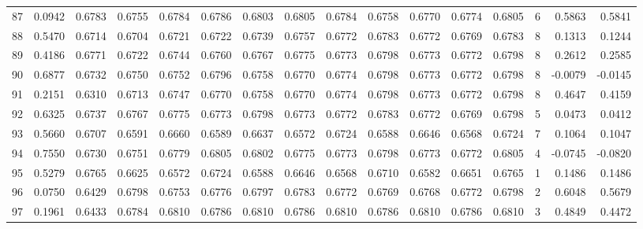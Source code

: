 \begin{tabular}{lrrrrrrrrrrrrrrr}
87  &      0.0942 &  0.6783 &  0.6755 &  0.6784 &  0.6786 &  0.6803 &  0.6805 &  0.6784 &  0.6758 &  0.6770 &   0.6774 &     0.6805 &      6 &                    0.5863 &                     0.5841 \\
88  &      0.5470 &  0.6714 &  0.6704 &  0.6721 &  0.6722 &  0.6739 &  0.6757 &  0.6772 &  0.6783 &  0.6772 &   0.6769 &     0.6783 &      8 &                    0.1313 &                     0.1244 \\
89  &      0.4186 &  0.6771 &  0.6722 &  0.6744 &  0.6760 &  0.6767 &  0.6775 &  0.6773 &  0.6798 &  0.6773 &   0.6772 &     0.6798 &      8 &                    0.2612 &                     0.2585 \\
90  &      0.6877 &  0.6732 &  0.6750 &  0.6752 &  0.6796 &  0.6758 &  0.6770 &  0.6774 &  0.6798 &  0.6773 &   0.6772 &     0.6798 &      8 &                   -0.0079 &                    -0.0145 \\
91  &      0.2151 &  0.6310 &  0.6713 &  0.6747 &  0.6770 &  0.6758 &  0.6770 &  0.6774 &  0.6798 &  0.6773 &   0.6772 &     0.6798 &      8 &                    0.4647 &                     0.4159 \\
92  &      0.6325 &  0.6737 &  0.6767 &  0.6775 &  0.6773 &  0.6798 &  0.6773 &  0.6772 &  0.6783 &  0.6772 &   0.6769 &     0.6798 &      5 &                    0.0473 &                     0.0412 \\
93  &      0.5660 &  0.6707 &  0.6591 &  0.6660 &  0.6589 &  0.6637 &  0.6572 &  0.6724 &  0.6588 &  0.6646 &   0.6568 &     0.6724 &      7 &                    0.1064 &                     0.1047 \\
94  &      0.7550 &  0.6730 &  0.6751 &  0.6779 &  0.6805 &  0.6802 &  0.6775 &  0.6773 &  0.6798 &  0.6773 &   0.6772 &     0.6805 &      4 &                   -0.0745 &                    -0.0820 \\
95  &      0.5279 &  0.6765 &  0.6625 &  0.6572 &  0.6724 &  0.6588 &  0.6646 &  0.6568 &  0.6710 &  0.6582 &   0.6651 &     0.6765 &      1 &                    0.1486 &                     0.1486 \\
96  &      0.0750 &  0.6429 &  0.6798 &  0.6753 &  0.6776 &  0.6797 &  0.6783 &  0.6772 &  0.6769 &  0.6768 &   0.6772 &     0.6798 &      2 &                    0.6048 &                     0.5679 \\
97  &      0.1961 &  0.6433 &  0.6784 &  0.6810 &  0.6786 &  0.6810 &  0.6786 &  0.6810 &  0.6786 &  0.6810 &   0.6786 &     0.6810 &      3 &                    0.4849 &                     0.4472 \\

\end{tabular}
